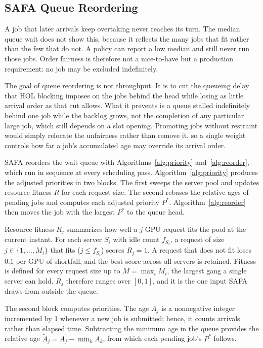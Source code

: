 \documentclass{ieeetj}
\begin{document}
\subsection{SAFA Queue Reordering}
A job that later arrivals keep overtaking never reaches its turn. The median queue wait does not show this, because it reflects the many jobs that fit rather than the few that do not. A policy can report a low median and still never run those jobs. Order fairness is therefore not a nice-to-have but a production requirement: no job may be excluded indefinitely.

The goal of queue reordering is not throughput. It is to cut the queueing delay that HOL blocking imposes on the jobs behind the head while losing as little arrival order as that cut allows. What it prevents is a queue stalled indefinitely behind one job while the backlog grows, not the completion of any particular large job, which still depends on a slot opening. Promoting jobs without restraint would simply relocate the unfairness rather than remove it, so a single weight controls how far a job's accumulated age may override its arrival order.

SAFA reorders the wait queue with Algorithms~\ref{alg:priority} and~\ref{alg:reorder}, which run in sequence at every scheduling pass. Algorithm~\ref{alg:priority} produces the adjusted priorities in two blocks. The first sweeps the server pool and updates resource fitness $R$ for each request size. The second rebases the relative ages of pending jobs and computes each adjusted priority $P^*$. Algorithm~\ref{alg:reorder} then moves the job with the largest $P^*$ to the queue head.

Resource fitness $R_j$ summarizes how well a $j$-GPU request fits the pool at the current instant. For each server $S_i$ with idle count $f_{S_i}$, a request of size $j\in\{1,\dots,M_i\}$ that fits ($j\le f_{S_i}$) scores $R_j=1$. A request that does not fit loses $0.1$ per GPU of shortfall, and the best score across all servers is retained. Fitness is defined for every request size up to $M=\max_i M_i$, the largest gang a single server can hold. $R_j$ therefore ranges over $[0,1]$, and it is the one input SAFA draws from outside the queue.

The second block computes priorities. The age $A_j$ is a nonnegative integer incremented by 1 whenever a new job is submitted; hence, it counts arrivals rather than elapsed time. Subtracting the minimum age in the queue provides the relative age $\tilde A_j=A_j-\min_k A_k$, from which each pending job's $P^*$ follows.
\end{document}

